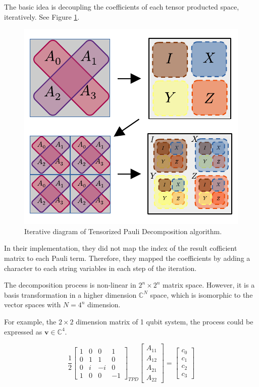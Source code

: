 \documentclass[twocolumn]{article}
\begin{document}
The basic idea is decoupling the coefficients of each tensor producted space, iteratively. 
See Figure \ref{fig:tpd_diagram}.

\begin{figure}[!h]
    \centering
    \includegraphics*{images/tpd_diagram.pdf}
    \caption{Iterative diagram of Tensorized Pauli Decomposition algorithm.}
    \label{fig:tpd_diagram}
\end{figure}

In their implementation, they did not map the index of the result cofficient matrix to 
each Pauli term. Therefore, they mapped the coefficients by adding a character to each string variables 
in each step of the iteration. 

The decomposition process is non-linear in $2^n \times 2^n$ matrix space. 
However, it is a basis transformation in a higher dimension $\mathbb{C}^N$ space, 
which is isomorphic to the vector spaces with $N = 4^n$ dimension.

For example, the $2 \times 2$ dimension matrix of 1 qubit system, the process could be expressed as 
$\mathbf{v} \in \mathbb{C}^4$. 

\begin{equation}
    \frac{1}{2}
    \begin{bmatrix}
        1 & 0 &  0 &  1\\
        0 & 1 &  1 &  0\\ 
        0 & i & -i &  0\\ 
        1 & 0 &  0 & -1 
    \end{bmatrix}_{TPD}
    \begin{bmatrix}
        A_{11} \\
        A_{12} \\
        A_{21} \\
        A_{22}
    \end{bmatrix} =
    \begin{bmatrix}
        c_0\\
        c_1\\
        c_2\\
        c_3
    \end{bmatrix}
\end{equation}
\end{document}
